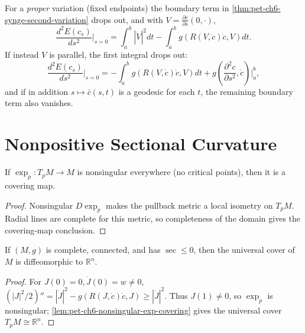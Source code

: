 \begin{remark}
  \label{rem:pet-ch6-second-variation-special-cases}
  \leanok
  For a \emph{proper} variation (fixed endpoints) the boundary term in
  \cref{thm:pet-ch6-synge-second-variation} drops out, and with $V=\frac{\partial
  c}{\partial s}(0,\cdot)$,
  \[
    \frac{d^2E(c_s)}{ds^2}\bigg|_{s=0}=\int_a^b|\dot V|^2dt-\int_a^bg(R(V,\dot c)\dot c,V)dt.
  \]
  If instead $V$ is parallel, the first integral drops out:
  \[
    \frac{d^2E(c_s)}{ds^2}\bigg|_{s=0}=-\int_a^bg(R(V,\dot c)\dot c,V)dt
    +g\!\left(\frac{\partial^2c}{\partial s^2},\dot c\right)\bigg|_a^b,
  \]
  and if in addition $s\mapsto\bar c(s,t)$ is a geodesic for each $t$, the
  remaining boundary term also vanishes.
\end{remark}

\section{Nonpositive Sectional Curvature}

\begin{lemma}
  \label{lem:pet-ch6-nonsingular-exp-covering}
  If $\exp_p:T_pM\to M$ is nonsingular everywhere (no critical points), then it
  is a covering map.
\end{lemma}
\begin{proof}
  \sketch
  Nonsingular \(D\exp_p\) makes the pullback metric a local isometry on \(T_pM\). Radial lines are complete for this metric, so completeness of the domain gives the covering-map conclusion.
\end{proof}

\begin{theorem}
  \label{thm:pet-ch6-cartan-hadamard}
  If $(M,g)$ is complete, connected, and has $\sec\le0$, then the universal
  cover of $M$ is diffeomorphic to $\mathbb{R}^n$.
\end{theorem}
\begin{proof}
  \sketch
  For \(J(0)=0,\dot J(0)=w\ne0\), \((|J|^2/2)''=|\dot J|^2-g(R(J,\dot c)\dot c,J)\ge|\dot J|^2\). Thus \(J(1)\ne0\), so \(\exp_p\) is nonsingular; \cref{lem:pet-ch6-nonsingular-exp-covering} gives the universal cover \(T_pM\cong\mathbb R^n\).
\end{proof}

